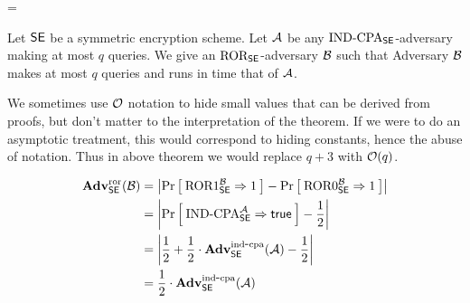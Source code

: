 \bnm
\AdvCTXT{\SE}{\advA} = \Prob{\CTXT_\SE^\advA\Rightarrow\true}\\
\enm


\begin{theorem}
Let ${\mathsf{SE}}$ be a symmetric encryption scheme. Let ${\mathcal A}$ be any
$\textnormal{IND-CPA}_{\mathsf{SE}}$-adversary making at most $q$ queries. 
We give an $\textnormal{ROR}_{\mathsf{SE}}$-adversary ${\mathcal B}$ such that
\bnm
  \AdvINDCPA{\SE}{\advA} \cdotsm\AdvROR{\SE}{\advB}
\enm
Adversary ${\mathcal B}$ makes at most $q$ 
queries and runs in time that of ${\mathcal A}$.
\end{theorem}

We sometimes use ${\cal O}$ notation to hide small values that can be derived from
proofs, but don't matter to the interpretation of the theorem. If we were to do
an asymptotic treatment, this would correspond to hiding constants, hence the
abuse of notation.  Thus in above theorem we would replace $q+3$ with
${\cal O}(q)$. 



\begin{align*}
\mathbf{Adv}^{\mathrm{ror}}_{{\mathsf{SE}}}({\mathcal B}) 
    &= \left|\Pr\left[\: \textnormal{ROR}1_{\mathsf{SE}}^{\mathcal B}\Rightarrow 1 \:\right] -
                                \Pr\left[\: \textnormal{ROR}0_{\mathsf{SE}}^{\mathcal B}\Rightarrow 1 \:\right]\right|\\
    &= \left|\Pr\left[\: \textnormal{IND-CPA}_{\mathsf{SE}}^{\mathcal A}\Rightarrow\mathsf{true} \:\right] - \frac{1}{2}\right|\\
    &= \left|\frac{1}{2} +
    \frac{1}{2}\cdot\mathbf{Adv}^{\mathrm{ind\mbox{-} cpa}}_{{\mathsf{SE}}}({\mathcal A}) - \frac{1}{2}\right|\\
    &= \frac{1}{2}\cdot\mathbf{Adv}^{\mathrm{ind\mbox{-} cpa}}_{{\mathsf{SE}}}({\mathcal A})
\end{align*}





